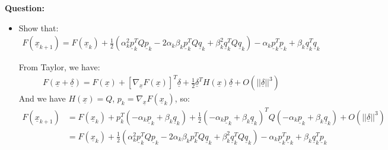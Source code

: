 \documentclass[11pt,letterpaper]{article}
\begin{document}
\begin{tcolorbox}
    \begin{flushleft}
        \textbf{Question:}\\
        \begin{itemize}
            \item Show that:
        \begin{align}
            F(\underline x_{k+1}) = F(\underline x_{k}) + \frac{1}{2} 
            (\alpha_k^2 \underline p_k^T Q \underline p_k 
            - 2\alpha_k\beta_k \underline p_k^T Q \underline q_k 
            + \beta_k^2 \underline q_k^T Q \underline q_k)
            - \alpha_k \underline p_k^T \underline p_k 
            + \beta_k \underline q_k^T \underline q_k
        \end{align}
        
        From Taylor, we have:
        \begin{align*}
            F(\underline x + \underline \delta) = 
            F(\underline x) + [\nabla_{\underline x} F(\underline x)]^T \underline \delta
            + \frac{1}{2} \underline \delta^T H(\underline x) \underline \delta
            + O(||\underline \delta||^3)
        \end{align*}
        And we have $H(\underline x) = Q$, $p_k = \nabla_{\underline x}F(\underline x_k)$, so: 
        \begin{align*}
             F(\underline x_{k+1}) &= F(\underline x_{k}) + p_k^T(-\alpha_k \underline p_k + \beta_k \underline q_k)
             + \frac{1}{2} (-\alpha_k \underline p_k + \beta_k \underline q_k)^T Q (-\alpha_k \underline p_k + \beta_k \underline q_k)
             + O(||\underline \delta||^3)
             \\
             &= F(\underline x_{k}) + \frac{1}{2} 
            (\alpha_k^2 \underline p_k^T Q \underline p_k 
            - 2\alpha_k\beta_k p_k^T Q \underline q_k 
            + \beta_k^2 \underline q_k^T Q \underline q_k)
            - \alpha_k \underline p_k^T \underline p_k 
            + \beta_k \underline q_k^T \underline p_k
        \end{align*}
        \end{itemize}
        
    \end{flushleft}
\end{tcolorbox}
\end{document}
